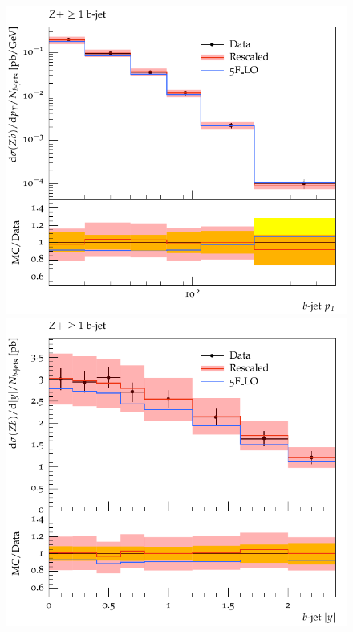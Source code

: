 \documentclass[11pt]{cernrep} \usepackage{graphicx,epsfig} 
\begin{document}
\begin{figure}[htbp]
\begin{center}
   \includegraphics[scale=0.65]{figs/zbb/sherpa/d03-x01-y01_rescaled.pdf} 
   \includegraphics[scale=0.65]{figs/zbb/sherpa/d05-x01-y01_rescaled.pdf} \\

\end{center}
\end{figure}
\end{document}
